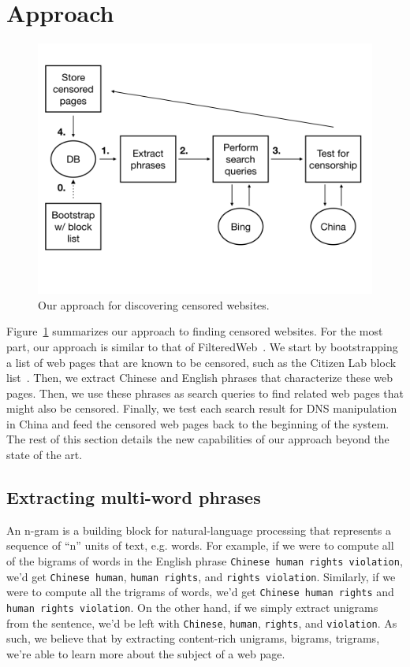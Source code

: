 \section{Approach}

\begin{figure}[t]
  \centering
  \includegraphics[scale=0.23]{figures/arch-2}
  \caption{\label{arch}Our approach for discovering censored websites.}
\end{figure}

Figure~\ref{arch} summarizes our approach to finding censored
websites. For the most part, our approach is similar to that of
FilteredWeb~\cite{darer2017filteredweb}. We start by bootstrapping a
list of web pages that are known to be censored, such as the Citizen
Lab block list~\cite{citizenlab:block}.  Then, we extract Chinese and
English phrases that characterize these web pages.  Then, we use these
phrases as search queries to find related web pages that might also be
censored. Finally, we test each search result for DNS manipulation in
China and feed the censored web pages back to the beginning of the
system. The rest of this section details the new capabilities of our
approach beyond the state of the art.

\subsection{Extracting multi-word phrases}
An n-gram is a building block for natural-language processing that
represents a sequence of ``n'' units of text, e.g. words. For example,
if we were to compute all of the bigrams of words in the English
phrase \texttt{Chinese human rights violation}, we'd get
\texttt{Chinese human}, \texttt{human rights}, and \texttt{rights
violation}. Similarly, if we were to compute all the trigrams of
words, we'd get \texttt{Chinese human rights} and \texttt{human rights
violation}. On the other hand, if we simply extract unigrams from the
sentence, we'd be left with \texttt{Chinese}, \texttt{human},
\texttt{rights}, and \texttt{violation}. As such, we believe that by
extracting content-rich unigrams, bigrams, trigrams, we're able to
learn more about the subject of a web page.

